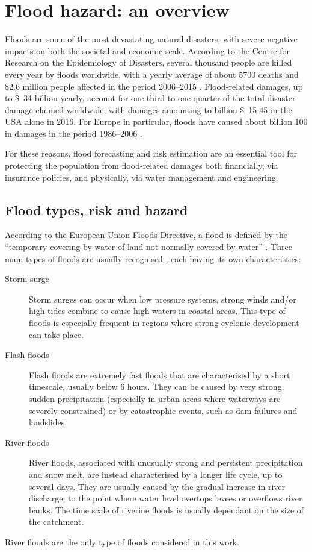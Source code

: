 \section{Flood hazard: an overview} \label{sec:flood_overview}
Floods are some of the most devastating natural disasters, with severe negative impacts on both the societal and economic scale. According to the Centre for Research on the Epidemiology of Disasters, several thousand people are killed every year by floods worldwide, with a yearly average of about 5700 deaths and 82.6 million people affected in the period 2006--2015 \citep{Guha-sapir2011}. Flood-related damages, up to \SI{34}[\$]{\nothing} billion  yearly, account for one third \citep{MunichRE} to one quarter \citep{Guha-sapir2011} of the total disaster damage claimed worldwide, with damages amounting to billion \SI{15.45}[\$]{\nothing} in the USA alone in 2016. For Europe in particular, floods have caused about billion \SI{100}[\officialeuro]{\nothing} in damages in the period 1986--2006 \citep{Cea2007}.

For these reasons, flood forecasting and risk estimation are an essential tool for protecting the population from flood-related damages both financially, via insurance policies, and physically, via water management and engineering.

\subsection{Flood types, risk and hazard}
According to the European Union Floods Directive, a flood is defined by the \enquote{temporary covering by water of land not normally covered by water} \citep{EUFD2007}.
Three main types of floods are usually recognised \citep[see][]{Kron2005}, each having its own characteristics:
\begin{description}
    \item[Storm surge] Storm surges can occur when low pressure systems, strong winds and/or high tides combine to cause high waters in coastal areas. This type of floods is especially frequent in regions where strong cyclonic development can take place.
    \item[Flash floods] Flash floods are extremely fast floods that are characterised by a short timescale, usually below 6 hours. They can be caused by very strong, sudden precipitation (especially in urban areas where waterways are severely constrained) or by catastrophic events, such as dam failures and landslides.
    \item[River floods] River floods, associated with unusually strong and persistent precipitation and snow melt, are instead characterised by a longer life cycle, up to several days. They are usually caused by the gradual increase in river discharge, to the point where water level overtops levees or overflows river banks. The time scale of riverine floods is usually dependant on the size of the catchment.
\end{description}
River floods are the only type of floods considered in this work.

